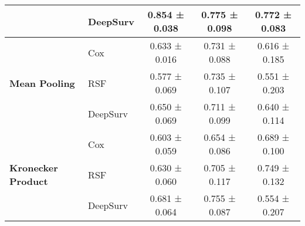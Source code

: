 \begin{sidewaystable}[htbp]
\begin{tabular}{@{}llccc@{}}
        & DeepSurv & 0.854 ± 0.038 & 0.775 ± 0.098 & 0.772 ± 0.083 \\
        \midrule
        \multirow{3}{*}{\textbf{Mean Pooling}} & Cox & 0.633 ± 0.016 & 0.731 ± 0.088 & 0.616 ± 0.185 \\
        & RSF & 0.577 ± 0.069 & 0.735 ± 0.107 & 0.551 ± 0.203 \\
        & DeepSurv & 0.650 ± 0.069 & 0.711 ± 0.099 & 0.640 ± 0.114 \\
        \midrule
        \multirow{3}{*}{\textbf{Kronecker Product}} & Cox & 0.603 ± 0.059 & 0.654 ± 0.086 & 0.689 ± 0.100 \\
        & RSF & 0.630 ± 0.060 & 0.705 ± 0.117 & 0.749 ± 0.132 \\
        & DeepSurv & 0.681 ± 0.064 & 0.755 ± 0.087 & 0.554 ± 0.207 \\
        \bottomrule
    \end{tabular}
\end{sidewaystable}